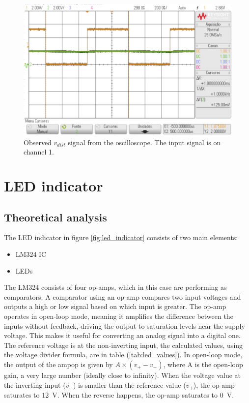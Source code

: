 \documentclass[lettersize,journal]{IEEEtran}
\begin{document}
\begin{figure}
    \centering
    \includegraphics[width=\linewidth]{images/vdist_scope.png}
    \caption{Observed $v_{dist}$ signal from the oscilloscope. The input signal is on channel 1.}
    \label{fig:vdist}
\end{figure}

\section{LED indicator}
\subsection{Theoretical analysis}
The LED indicator in figure \ref{fig:led_indicator} consists of two main elements:
\begin{itemize}
    \item LM324 IC
    \item LEDs
\end{itemize}

The LM324 consists of four op-amps, which in this case are performing as comparators. A comparator using an op-amp compares two input voltages and outputs a high or low signal based on which input is greater. The op-amp operates in open-loop mode, meaning it amplifies the difference between the inputs without feedback, driving the output to saturation levels near the supply voltage. This makes it useful for converting an analog signal into a digital one.\\

The reference voltage is at the non-inverting input, the calculated values, using the voltage divider formula, are in table (\ref{tab:led_values}). In open-loop mode, the output of the ampop is given by $A \times (v_+ - v_{-})$, where A is the open-loop gain, a very large number (ideally close to infinity). When the voltage value at the inverting input ($v_{-}$) is smaller than the reference value ($v_+$), the op-amp saturates to \SI{12}{\volt}. When the reverse happens, the op-amp saturates to \SI{0}{\volt}.\\
\end{document}
